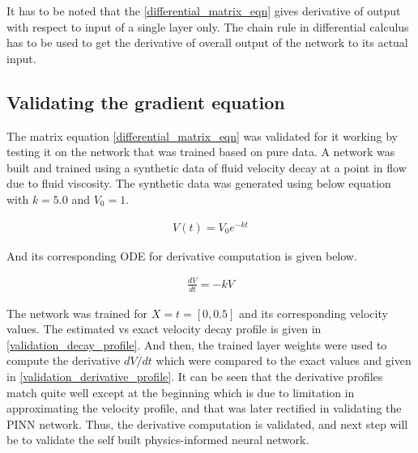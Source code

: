 \par{}
It has to be noted that the \cref{differential_matrix_eqn} gives derivative
of output with respect to input of a single layer only. The chain rule in
differential calculus has to be used to get the derivative of overall output
of the network to its actual input.\\

\subsection{Validating the gradient equation}
\par{}
The matrix equation \cref{differential_matrix_eqn} was validated for it working
by testing it on the network that was trained based on pure data. A network
was built and trained using a synthetic data of fluid velocity decay at a point
in flow due to fluid viscosity. The synthetic data was generated using below equation
with \(k = 5.0\) and \(V_0 = 1\).

\begin{align*}
    V(t) = V_0 e^{-k t}
\end{align*}

And its corresponding ODE for derivative computation is given below.

\begin{align*}
    \frac{d V}{d t} = -k V
\end{align*}

\par{}
The network was trained for \(X = t = [0,0.5]\) and its corresponding velocity
values. The estimated vs exact velocity decay profile is given in
\cref{validation_decay_profile}.  And then, the trained layer weights were used
to compute the derivative \(d V/d t\) which were compared to the exact values
and given in \cref{validation_derivative_profile}.  It can be seen that the
derivative profiles match quite well except at the beginning which is due to
limitation in approximating the velocity profile, and that was later rectified
in validating the PINN network. Thus, the derivative computation is validated,
and next step will be to validate the self built physics-informed neural
network.

